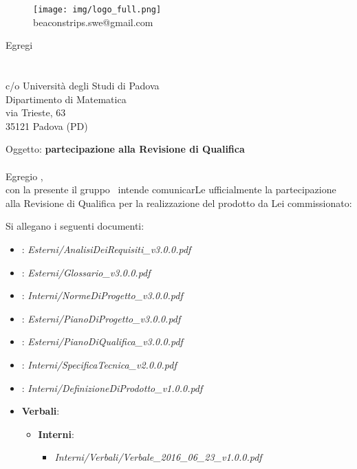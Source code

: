 \documentclass[a4paper]{article}
\newcommand{\spazio}{\vspace{1.5cm}}
\begin{document}
\spazio
\begin{figure}[!h]
	\centering
	\texttt{[image: img/logo\_full.png]} \\
	beaconstrips.swe@gmail.com
\end{figure}

\spazio

\begin{flushright}
\date{2016-08-17}
Egregi \\
\COMMITTENTE \\
\CARDIN \\
c/o Università degli Studi di Padova  \\
Dipartimento di Matematica \\
via Trieste, 63 \\
35121 Padova (PD)
\end{flushright}
\spazio

Oggetto: \textbf{partecipazione alla Revisione di Qualifica} \\ \\
Egregio \COMMITTENTE,\\
con la presente il gruppo \AUTORE \ intende comunicarLe ufficialmente la partecipazione alla Revisione di Qualifica per la realizzazione del prodotto da Lei commissionato: \\

Si allegano i seguenti documenti:
\begin{itemize}
	\item \textbf{\ARdocRQ}: \textit{Esterni/AnalisiDeiRequisiti\_v3.0.0.pdf}
	\item \textbf{\GldocRQ}: \textit{Esterni/Glossario\_v3.0.0.pdf}
	\item \textbf{\NPdocRQ}: \textit{Interni/NormeDiProgetto\_v3.0.0.pdf}
	\item \textbf{\PPdocRQ}: \textit{Esterni/PianoDiProgetto\_v3.0.0.pdf}
	\item \textbf{\PQdocRQ}: \textit{Esterni/PianoDiQualifica\_v3.0.0.pdf}
	\item \textbf{\SFdocRQ}: \textit{Interni/SpecificaTecnica\_v2.0.0.pdf}
	\item \textbf{\DPdocRQ}: \textit{Interni/DefinizioneDiProdotto\_v1.0.0.pdf}
	\item \textbf{Verbali}:
		\begin{itemize}
			\item \textbf{Interni}:
				\begin{itemize}
					\item \textit{Interni/Verbali/Verbale\_2016\_06\_23\_v1.0.0.pdf}
				\end{itemize}
		\end{itemize}
	\end{itemize}
\spazio
\end{document}
